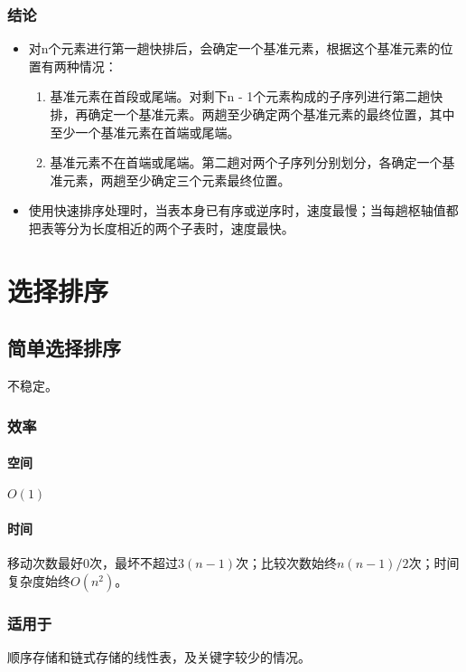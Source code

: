\subsubsection{结论}
\begin{itemize}
    \item 对n个元素进行第一趟快排后，会确定一个基准元素，根据这个基准元素的位置有两种情况：\begin{enumerate}
    \item 基准元素在首段或尾端。对剩下n - 1个元素构成的子序列进行第二趟快排，再确定一个基准元素。两趟至少确定两个基准元素的最终位置，其中至少一个基准元素在首端或尾端。
    \item 基准元素不在首端或尾端。第二趟对两个子序列分别划分，各确定一个基准元素，两趟至少确定三个元素最终位置。
    \end{enumerate}
    \item 使用快速排序处理时，当表本身已有序或逆序时，速度最慢；当每趟枢轴值都把表等分为长度相近的两个子表时，速度最快。
\end{itemize}


\section{选择排序}

\subsection{简单选择排序}
不稳定。

\subsubsection{效率}

\paragraph{空间}
\(O(1)\)

\paragraph{时间}
移动次数最好0次，最坏不超过\(3(n - 1)\)次；比较次数始终\(n(n - 1) / 2\)次；时间复杂度始终\(O(n^2)\)。


\subsubsection{适用于}
顺序存储和链式存储的线性表，及关键字较少的情况。



